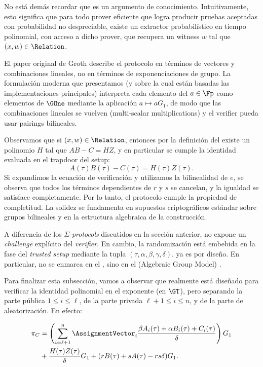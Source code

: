 No está demás recordar que \Groth es un argumento de conocimiento. Intuitivamente, esto significa que para todo prover eficiente que logra producir pruebas aceptadas con probabilidad no despreciable, existe un extractor probabilístico en tiempo polinomial, con acceso a dicho prover, que recupera un witness $w$ tal que $(x, w) \in \Relation$.

El paper original de Groth \cite{cryptoeprint:2016/260} describe el protocolo en términos de vectores y combinaciones lineales, no en términos de exponenciaciones de grupo. La formulación moderna que presentamos (y sobre la cual están basadas las implementaciones principales) interpreta cada elemento del \SRS $a \in \Fp$ como elementos de $\GOne$ mediante la aplicación $a \mapsto aG_1$, de modo que las combinaciones lineales se vuelven \MSM (multi-scalar multiplications) y el verifier pueda usar pairings bilineales.

Observamos que si $(x, w) \in \Relation$, entonces por la definición del \QAP existe un polinomio $H$ tal que $AB - C = HZ$, y en particular se cumple la identidad evaluada en el trapdoor del setup:
$$A(\tau)B(\tau) - C(\tau) = H(\tau)Z(\tau).$$
Si expandimos la ecuación de verificación y utilizamos la bilinealidad de $e$, se observa que todos los términos dependientes de $r$ y $s$ se cancelan, y la igualdad se satisface completamente. Por lo tanto, el protocolo cumple la propiedad de completitud. La solidez se fundamenta en supuestos criptográficos estándar sobre grupos bilineales y en la estructura algebraica de la construcción.

A diferencia de los $\Sigma$-\textit{protocols} discutidos en la sección anterior, \Groth no expone un \textit{challenge} explícito del \textit{verifier}. En cambio, la randomización está embebida en la fase del \textit{trusted setup} mediante la tupla $(\tau, \alpha, \beta, \gamma, \delta)$. \Groth ya es \NIZK por diseño. En particular, no se enmarca en el \ROM, sino en el \AGM (Algebraic Group Model) \cite{Fuchsbauer2018}.

Para finalizar esta subsección, vamos a observar que \Groth realmente está diseñado para verificar la identidad polinomial en el exponente (en $\GT$), pero separando la parte pública $1 \leq i \leq \ell$, de la parte privada $\ell + 1 \leq i \leq n$, y de la parte de aleatorización. En efecto:

$$\begin{aligned}
	\pi_C &= \left(\sum_{i=\ell+1}^{n} \AssignmentVector_i \frac{\beta A_i(\tau) + \alpha B_i(\tau) + C_i(\tau)}{\delta}\right) G_1 \\
	&+ \frac{H(\tau)Z(\tau)}{\delta} G_1 + (rB(\tau) + sA(\tau) - rs\delta)G_1.
\end{aligned}$$

